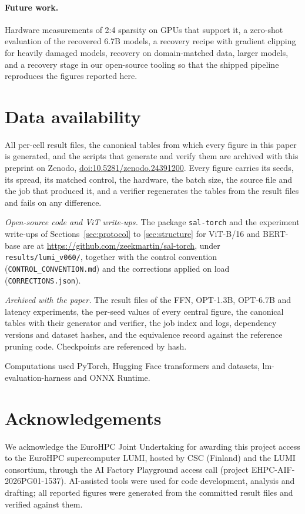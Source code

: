 \documentclass[11pt,a4paper]{article}
\begin{document}
\paragraph{Future work.} Hardware measurements of 2:4 sparsity on GPUs that support it, a zero-shot evaluation of the recovered 6.7B models, a recovery recipe with gradient clipping for heavily damaged models, recovery on domain-matched data, larger models, and a recovery stage in our open-source tooling so that the shipped pipeline reproduces the figures reported here.

\section*{Data availability}
All per-cell result files, the canonical tables from which every figure in this paper is generated, and the scripts that generate and verify them are archived with this preprint on Zenodo, \href{https://doi.org/10.5281/zenodo.24391200}{doi:10.5281/zenodo.24391200}. Every figure carries its seeds, its spread, its matched control, the hardware, the batch size, the source file and the job that produced it, and a verifier regenerates the tables from the result files and fails on any difference.

\emph{Open-source code and ViT write-ups.} The package \texttt{sal-torch} and the experiment write-ups of Sections~\ref{sec:protocol} to \ref{sec:structure} for ViT-B/16 and BERT-base are at \url{https://github.com/zeekmartin/sal-torch}, under \texttt{results/lumi\_v060/}, together with the control convention (\texttt{CONTROL\_CONVENTION.md}) and the corrections applied on load (\texttt{CORRECTIONS.json}).

\emph{Archived with the paper.} The result files of the FFN, OPT-1.3B, OPT-6.7B and latency experiments, the per-seed values of every central figure, the canonical tables with their generator and verifier, the job index and logs, dependency versions and dataset hashes, and the equivalence record against the reference pruning code. Checkpoints are referenced by hash.

Computations used PyTorch, Hugging Face transformers and datasets, lm-evaluation-harness and ONNX Runtime.

\section*{Acknowledgements}
We acknowledge the EuroHPC Joint Undertaking for awarding this project access to the EuroHPC supercomputer LUMI, hosted by CSC (Finland) and the LUMI consortium, through the AI Factory Playground access call (project EHPC-AIF-2026PG01-1537). AI-assisted tools were used for code development, analysis and drafting; all reported figures were generated from the committed result files and verified against them.



\end{document}
